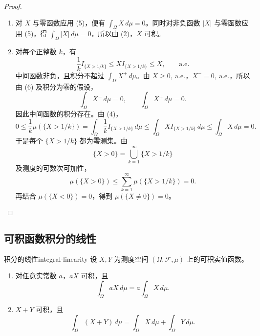 \begin{proof}
\begin{enumerate}
对一般实值函数，由 $X=Y,\ \mathrm{a.e.}$，有 $X^+=Y^+,\ \mathrm{a.e.}$ 和 $X^-=Y^-,\ \mathrm{a.e.}$。由非负情形，
\[
\int_\Omega X^+\,d\mu=\int_\Omega Y^+\,d\mu,\qquad
\int_\Omega X^-\,d\mu=\int_\Omega Y^-\,d\mu.
\]
若 $X$ 的积分存在，则左侧至少有一个有限，右侧也如此，所以 $Y$ 的积分存在。将这两式相减，便得所需等式。若先知 $Y$ 的积分存在，交换两者即可。
\item 对 $X$ 与零函数应用 (5)，便有 $\displaystyle\int_\Omega X\,d\mu=0$。同时对非负函数 $|X|$ 与零函数应用 (5)，得 $\displaystyle\int_\Omega|X|\,d\mu=0$，所以由 (2)，$X$ 可积。
\item 对每个正整数 $k$，有
\[
\frac1k I_{\{X>1/k\}}\leq XI_{\{X>1/k\}}\leq X,
\qquad\mathrm{a.e.}
\]
中间函数非负，且积分不超过 $\displaystyle\int_\Omega X^+\,d\mu$。由 $X\geq0,\ \mathrm{a.e.}$，$X^-=0,\ \mathrm{a.e.}$，所以由 (6) 及积分为零的假设，
\[
\int_\Omega X^-\,d\mu=0,\qquad
\int_\Omega X^+\,d\mu=0.
\]
因此中间函数的积分存在。由 (4)，
\[
0\leq\frac1k\mu(\{X>1/k\})
=\int_\Omega\frac1k I_{\{X>1/k\}}\,d\mu
\leq\int_\Omega XI_{\{X>1/k\}}\,d\mu
\leq\int_\Omega X\,d\mu=0.
\]
于是每个 $\{X>1/k\}$ 都为零测集。由
\[
\{X>0\}=\bigcup_{k=1}^{\infty}\{X>1/k\}
\]
及测度的可数次可加性，
\[
\mu(\{X>0\})\leq\sum_{k=1}^{\infty}\mu(\{X>1/k\})=0.
\]
再结合 $\mu(\{X<0\})=0$，得到 $\mu(\{X\ne0\})=0$。
\end{enumerate}
\end{proof}

\subsection*{可积函数积分的线性}

\begin{mytheorem}{积分的线性}{integral-linearity}
设 $X,Y$ 为测度空间 $(\Omega,\mathcal F,\mu)$ 上的可积实值函数。
\begin{enumerate}
\item 对任意实常数 $a$，$aX$ 可积，且
\[
\int_\Omega aX\,d\mu=a\int_\Omega X\,d\mu.
\]
\item $X+Y$ 可积，且
\[
\int_\Omega(X+Y)\,d\mu
=\int_\Omega X\,d\mu+\int_\Omega Y\,d\mu.
\]
\end{enumerate}
\end{mytheorem}

